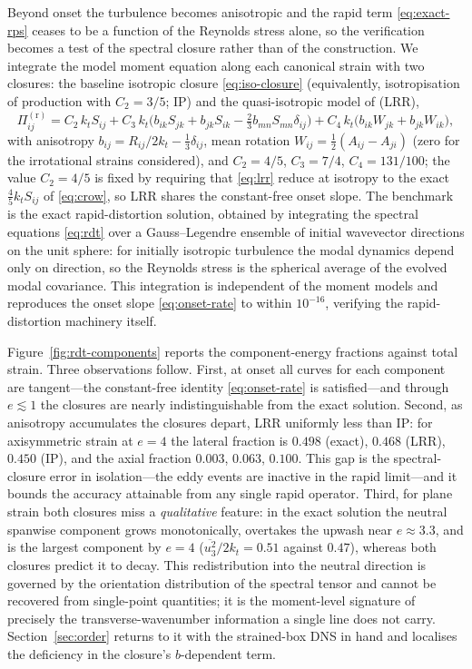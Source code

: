 \documentclass[lineno]{JFM-FLM_Au}
\providecommand{\DIFadd}[1]{{\protect\color{blue}\uwave{#1}}} %
\providecommand{\DIFaddbegin}{} %
\providecommand{\DIFaddend}{} %
\begin{document}
Beyond onset the turbulence becomes anisotropic and the rapid term
\eqref{eq:exact-rps} ceases to be a function of the Reynolds stress
alone, so the verification becomes a test of the spectral closure rather
than of the construction. We integrate the model moment equation along
each canonical strain with two closures: the baseline isotropic closure
\eqref{eq:iso-closure} (equivalently, isotropisation of production with
$C_2=3/5$; IP) and the quasi-isotropic model of \citet{LaunderReeceRodi1975} (\DIFaddbegin \DIFadd{LRR-QI, abbreviated }\DIFaddend LRR),
\begin{equation}
  \Pi^{(\mathrm r)}_{ij} = C_2\,k_t S_{ij}
  + C_3\,k_t\big(b_{ik}S_{jk}+b_{jk}S_{ik}
  -\tfrac{2}{3}b_{mn}S_{mn}\delta_{ij}\big)
  + C_4\,k_t\big(b_{ik}W_{jk}+b_{jk}W_{ik}\big),
  \label{eq:lrr}
\end{equation}
with anisotropy $b_{ij}=R_{ij}/2k_t-\tfrac13\delta_{ij}$, mean rotation
$W_{ij}=\tfrac12(A_{ij}-A_{ji})$ (zero for the irrotational strains
considered), and $C_2=4/5$, $C_3=7/4$, $C_4=131/100$; the value
$C_2=4/5$ is fixed by requiring that \eqref{eq:lrr} reduce at isotropy to
the exact $\tfrac45k_tS_{ij}$ of \eqref{eq:crow}, so LRR shares the
constant-free onset slope. The benchmark is the exact rapid-distortion
solution, obtained by integrating the spectral equations \eqref{eq:rdt}
over a Gauss--Legendre ensemble of initial wavevector directions on the
unit sphere: for initially isotropic turbulence the modal dynamics depend
only on direction, so the Reynolds stress is the spherical average of the
evolved modal covariance. This integration is independent of the moment
models and reproduces the onset slope \eqref{eq:onset-rate} to within
$10^{-16}$, verifying the rapid-distortion machinery itself.

Figure~\ref{fig:rdt-components} reports the component-energy fractions
against total strain. Three observations follow. First, at onset all
curves for each component are tangent---the constant-free identity
\eqref{eq:onset-rate} is satisfied---and through $e\lesssim1$ the
closures are nearly indistinguishable from the exact solution. Second,
as anisotropy accumulates the closures depart, LRR uniformly less than
IP: for axisymmetric strain at $e=4$ the lateral fraction is $0.498$
(exact), $0.468$ (LRR), $0.450$ (IP), and the axial fraction $0.003$,
$0.063$, $0.100$. This gap is the spectral-closure error in
isolation---the eddy events are inactive in the rapid limit---and it
bounds the accuracy attainable from any single rapid operator. Third, for plane strain both closures miss
a \emph{qualitative} feature: in the exact solution the neutral spanwise
component grows monotonically, overtakes the upwash near $e\approx3.3$,
and is the largest component by $e=4$
($\overline{u_3^2}/2k_t=0.51$ against $0.47$), whereas both closures
predict it to decay. This redistribution into the neutral direction is
governed by the orientation distribution of the spectral tensor and
cannot be recovered from single-point quantities; it is the moment-level
signature of precisely the transverse-wavenumber information a single
line does not carry. Section~\ref{sec:order} returns to it with the
strained-box DNS in hand and localises the deficiency in the closure's
$b$-dependent term.
\end{document}
